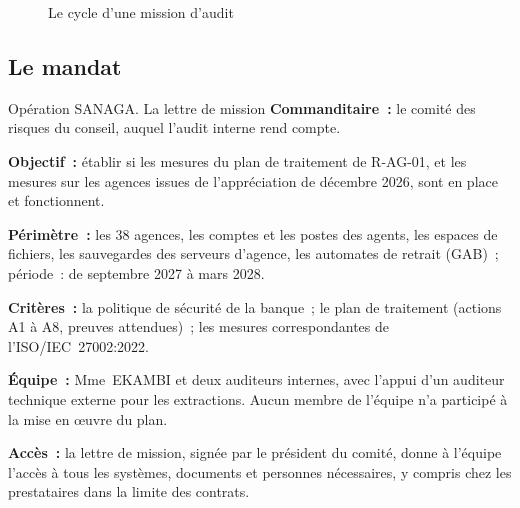 \begin{figure}[H]
\centering
{}
\caption{Le cycle d'une mission d'audit}
\label{fig:c06-cycle}
\end{figure}

\subsection{Le mandat}

\begin{boxscenario}{Opération SANAGA. La lettre de mission}
\textbf{Commanditaire~:} le comité des risques du conseil, auquel l'audit
interne rend compte.

\medskip
\textbf{Objectif~:} établir si les mesures du plan de traitement de
R-AG-01, et les mesures sur les agences issues de l'appréciation de
décembre 2026, sont en place et fonctionnent.

\medskip
\textbf{Périmètre~:} les 38 agences, les comptes et les postes des agents,
les espaces de fichiers, les sauvegardes des serveurs d'agence, les
automates de retrait (GAB)~; période~: de septembre 2027 à mars 2028.

\medskip
\textbf{Critères~:} la politique de sécurité de la banque~; le plan de
traitement (actions A1 à A8, preuves attendues)~; les mesures
correspondantes de l'ISO/IEC~27002:2022.

\medskip
\textbf{Équipe~:} Mme~EKAMBI et deux auditeurs internes, avec l'appui
d'un auditeur technique externe pour les extractions. Aucun membre de
l'équipe n'a participé à la mise en œuvre du plan.

\medskip
\textbf{Accès~:} la lettre de mission, signée par le président du comité,
donne à l'équipe l'accès à tous les systèmes, documents et personnes
nécessaires, y compris chez les prestataires dans la limite des contrats.
\end{boxscenario}


